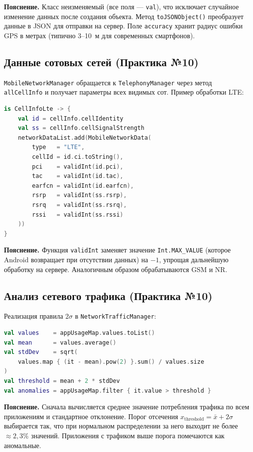 \documentclass[a4paper,14pt,oneside,openany]{memoir}
\begin{document}
\textbf{Пояснение.} Класс неизменяемый (все поля — \texttt{val}), что
исключает случайное изменение данных после создания объекта. Метод
\texttt{toJSONObject()} преобразует данные в JSON для отправки на сервер.
Поле \texttt{accuracy} хранит радиус ошибки GPS в метрах (типично
3--10~м для современных смартфонов).

\subsection{Данные сотовых сетей (Практика №10)}

\texttt{MobileNetworkManager} обращается к \texttt{TelephonyManager}
через метод \texttt{allCellInfo} и получает параметры всех видимых сот.
Пример обработки LTE:

\begin{lstlisting}[language=Kotlin,
    caption={Обработка LTE-соты в MobileNetworkManager}]
is CellInfoLte -> {
    val id = cellInfo.cellIdentity
    val ss = cellInfo.cellSignalStrength
    networkDataList.add(MobileNetworkData(
        type   = "LTE",
        cellId = id.ci.toString(),
        pci    = validInt(id.pci),
        tac    = validInt(id.tac),
        earfcn = validInt(id.earfcn),
        rsrp   = validInt(ss.rsrp),
        rsrq   = validInt(ss.rsrq),
        rssi   = validInt(ss.rssi)
    ))
}
\end{lstlisting}

\textbf{Пояснение.} Функция \texttt{validInt} заменяет значение
\texttt{Int.MAX\_VALUE} (которое Android возвращает при отсутствии
данных) на $-1$, упрощая дальнейшую обработку на сервере. Аналогичным
образом обрабатываются GSM и NR.

\subsection{Анализ сетевого трафика (Практика №10)}

Реализация правила $2\sigma$ в \texttt{NetworkTrafficManager}:

\begin{lstlisting}[language=Kotlin,
    caption={Фрагмент NetworkTrafficManager.kt}]
val values    = appUsageMap.values.toList()
val mean      = values.average()
val stdDev    = sqrt(
    values.map { (it - mean).pow(2) }.sum() / values.size
)
val threshold = mean + 2 * stdDev
val anomalies = appUsageMap.filter { it.value > threshold }
\end{lstlisting}

\textbf{Пояснение.} Сначала вычисляется среднее значение потребления
трафика по всем приложениям и стандартное отклонение. Порог отсечения
$x_{\mathrm{threshold}} = \bar{x} + 2\sigma$ выбирается так, что при
нормальном распределении за него выходит не более $\approx 2{,}3\%$
значений. Приложения с трафиком выше порога помечаются как аномальные.
\end{document}
